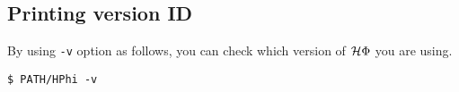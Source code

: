 \begin{enumerate}
\begin{itemize}
\end{itemize}

\subsection{Printing version ID}

By using \verb|-v| option as follows, 
you can check which version of $\mathcal{H} \Phi$ you are using.

\begin{verbatim}
$ PATH/HPhi -v
\end{verbatim}

\end{enumerate}

